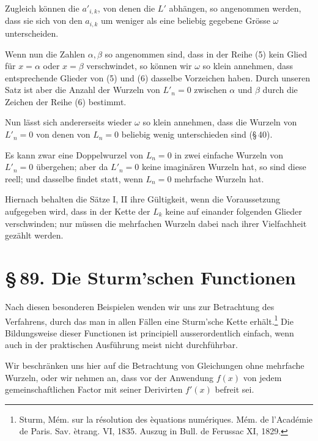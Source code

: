 \documentclass[11pt]{article}
\providecommand{\sect}[2]{\section*{\S\,#1. #2}}
\begin{document}
Zugleich k\"onnen die $a'_{i,k}$, von denen die $L'$ abh\"angen, so angenommen werden, dass sie sich von den $a_{i,k}$ um weniger als eine beliebig gegebene Gr\"osse $\omega$ unterscheiden.

Wenn nun die Zahlen $\alpha,\beta$ so angenommen sind, dass in der Reihe (5) kein Glied f\"ur $x=\alpha$ oder $x=\beta$ verschwindet, so k\"onnen wir $\omega$ so klein annehmen, dass entsprechende Glieder von (5) und (6) dasselbe Vorzeichen haben. Durch unseren Satz ist aber die Anzahl der Wurzeln von $L'_n=0$ zwischen $\alpha$ und $\beta$ durch die Zeichen der Reihe (6) bestimmt.

Nun l\"asst sich andererseits wieder $\omega$ so klein annehmen, dass die Wurzeln von $L'_n=0$ von denen von $L_n=0$ beliebig wenig unterschieden sind (\S\,40).

Es kann zwar eine Doppelwurzel von $L_n=0$ in zwei einfache Wurzeln von $L'_n=0$ \"ubergehen; aber da $L'_n=0$ keine imagin\"aren Wurzeln hat, so sind diese reell; und dasselbe findet statt, wenn $L_n=0$ mehrfache Wurzeln hat.

Hiernach behalten die S\"atze I, II ihre G\"ultigkeit, wenn die Voraussetzung aufgegeben wird, dass in der Kette der $L_k$ keine auf einander folgenden Glieder verschwinden; nur m\"ussen die mehrfachen Wurzeln dabei nach ihrer Vielfachheit gez\"ahlt werden.

\sect{89}{Die Sturm'schen Functionen}

Nach diesen besonderen Beispielen wenden wir uns zur Betrachtung des Verfahrens, durch das man in allen F\"allen eine Sturm'sche Kette erh\"alt.\footnote{Sturm, M\'em. sur la r\'esolution des \`equations num\'eriques. M\'em. de l'Acad\'emie de Paris. Sav. \`etrang. VI, 1835. Auszug in Bull. de Ferussac XI, 1829.} Die Bildungsweise dieser Functionen ist principiell ausserordentlich einfach, wenn auch in der praktischen Ausf\"uhrung meist nicht durchf\"uhrbar.

Wir beschr\"anken uns hier auf die Betrachtung von Gleichungen ohne mehrfache Wurzeln, oder wir nehmen an, dass vor der Anwendung $f(x)$ von jedem gemeinschaftlichen Factor mit seiner Derivirten $f'(x)$ befreit sei.
\end{document}
